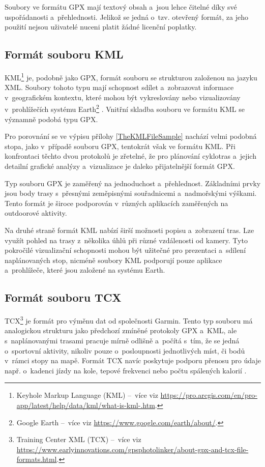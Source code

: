 Soubory ve formátu GPX mají textový obsah a~jsou lehce čitelné díky své uspořádanosti a~přehlednosti.
Jelikož se jedná o~tzv. otevřený formát, za jeho použití nejsou uživatelé nuceni platit žádné licenční poplatky.

\subsection{Formát souboru KML}
\label{the-kml-file-format}

KML\footnote{Keyhole Markup Language (KML) --~více viz \url{https://pro.arcgis.com/en/pro-app/latest/help/data/kml/what-is-kml-.htm}.} je, podobně jako GPX, formát souboru se strukturou založenou na jazyku XML.
Soubory tohoto typu mají schopnost sdílet a~zobrazovat informace v~geografickém kontextu, které mohou být vykreslovány nebo vizualizovány v~prohlížečích systému Earth\footnote{Google Earth --~více viz \url{https://www.google.com/earth/about/}.} \cite{ConsortiumOpenGeospatial2024}.
Vnitřní skladba souboru ve formátu KML se významně podobá typu GPX.

Pro porovnání se ve výpisu přílohy \ref{TheKMLFileSample} nachází velmi podobná stopa, jako v~případě souboru GPX, tentokrát však ve formátu KML.
Při konfrontaci těchto dvou protokolů je zřetelné, že pro plánování cyklotras a~jejich detailní grafické analýzy a~vizualizace je daleko přijatelnější formát GPX.

Typ souboru GPX je zaměřený na jednoduchost a~přehlednost.
Základními prvky jsou body trasy s~přesnými zeměpisnými souřadnicemi a~nadmořskými výškami.
Tento formát je široce podporován v~různých aplikacích zaměřených na outdoorové aktivity.

Na druhé straně formát KML nabízí širší možnosti popisu a~zobrazení tras.
Lze využít pohled na trasy z~několika úhlů při různé vzdálenosti od kamery.
Tyto pokročilé vizualizační schopnosti mohou být užitečné pro prezentaci a~sdílení naplánovaných stop, nicméně soubory KML podporují pouze aplikace a~prohlížeče, které jsou založené na systému Earth.

\subsection{Formát souboru TCX}
\label{the-tcx-file-format}

TCX\footnote{Training Center XML (TCX) --~více viz \url{https://www.earlyinnovations.com/gpsphotolinker/about-gpx-and-tcx-file-formats.html}.} je formát pro výměnu dat od společnosti Garmin.
Tento typ souboru má analogickou strukturu jako předchozí zmíněné protokoly GPX a~KML, ale s~naplánovanými trasami pracuje mírně odlišně a~počítá s~tím, že se jedná o~sportovní aktivity, nikoliv pouze o~posloupnosti jednotlivých míst, či bodů v~rámci stopy na mapě.
Formát TCX navíc poskytuje podporu přenosu pro údaje např. o~kadenci jízdy na kole, tepové frekvenci nebo počtu spálených kalorií \cite{AnssensCharles2021}.

